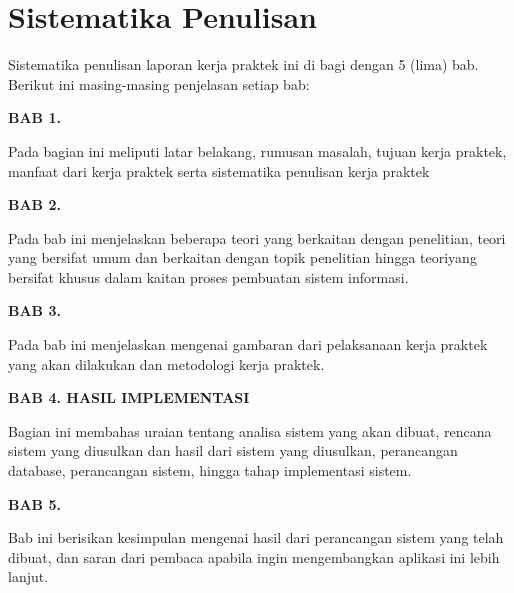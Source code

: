 \section{Sistematika Penulisan}
Sistematika penulisan laporan kerja praktek ini di bagi dengan 5 (lima) bab.
Berikut ini masing-masing penjelasan setiap bab:


\textbf{BAB 1. \babSatu}

Pada bagian ini meliputi latar belakang, rumusan masalah, tujuan kerja praktek, manfaat dari kerja praktek serta sistematika penulisan kerja praktek

\textbf{BAB 2. \babDua}

Pada bab ini menjelaskan beberapa teori yang berkaitan dengan penelitian, teori yang bersifat umum dan berkaitan dengan topik penelitian hingga teoriyang bersifat khusus dalam kaitan proses pembuatan sistem informasi.


\textbf{BAB 3. \babTiga}

Pada bab ini menjelaskan mengenai gambaran dari pelaksanaan kerja praktek yang akan dilakukan dan metodologi kerja praktek.


\textbf{BAB 4. HASIL IMPLEMENTASI}

Bagian ini membahas uraian tentang analisa sistem yang akan dibuat, rencana sistem yang diusulkan dan hasil dari sistem yang diusulkan, perancangan database, perancangan sistem, hingga tahap implementasi sistem.

\textbf{BAB 5. \babLima}

Bab ini berisikan kesimpulan mengenai hasil dari perancangan sistem yang telah dibuat, dan saran dari pembaca apabila ingin mengembangkan aplikasi ini lebih lanjut.